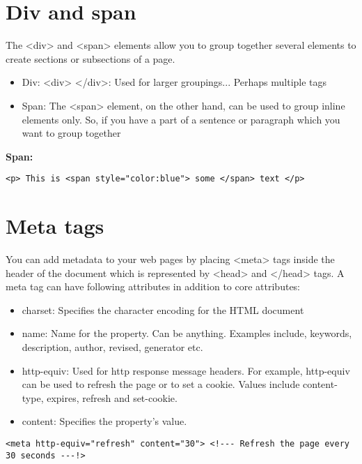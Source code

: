 \documentclass{report}
\begin{document}
    \section{\LARGE Div and span}
    \bigbreak \noindent 
    The <div> and <span> elements allow you to group together several elements to create sections or subsections of a page.
    \bigbreak \noindent 
    \begin{itemize}
        \item Div: <div> </div>: Used for larger groupings... Perhaps multiple tags
        \item Span: The <span> element, on the other hand, can be used to group inline elements only. So, if you have a part of a sentence or paragraph which you want to group together
    \end{itemize}
    \bigbreak \noindent 
    \textbf{Span:}
    \bigbreak \noindent 
    \sepline
    \begin{verbatim}
<p> This is <span style="color:blue"> some </span> text </p>
    \end{verbatim}
    \sepline

    \bigbreak \noindent 
    \section{\LARGE Meta tags}
    \bigbreak \noindent 
    You can add metadata to your web pages by placing <meta> tags inside the header of the
    document which is represented by <head> and </head> tags. A meta tag can have
    following attributes in addition to core attributes:
    \begin{itemize}
        \item charset: Specifies the character encoding for the HTML document
        \item name: Name for the property. Can be anything. Examples include, keywords, description, author, revised, generator etc.
        \item http-equiv: Used for http response message headers. For example, http-equiv can be used to refresh the page or to set a cookie. Values include content-type, expires, refresh and set-cookie.
        \item content: Specifies the property's value.
    \end{itemize}
    \bigbreak \noindent 
    \sepline
    \begin{verbatim}
<meta http-equiv="refresh" content="30"> <!--- Refresh the page every 30 seconds ---!>
    \end{verbatim}
    \sepline
\end{document}
